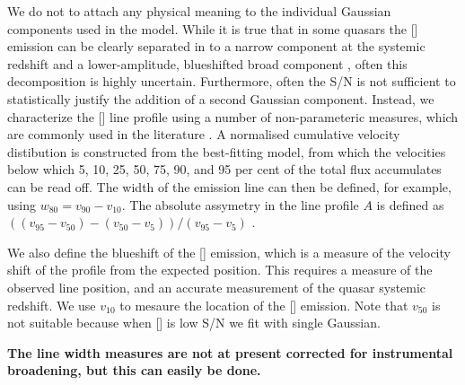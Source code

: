 We do not to attach any physical meaning to the individual Gaussian components used in the model. 
While it is true that in some quasars the [] emission can be clearly separated in to a narrow component at the systemic redshift and a lower-amplitude, blueshifted broad component \citep[e.g.][]{shen16a}, often this decomposition is highly uncertain.
Furthermore, often the S/N is not sufficient to statistically justify the addition of a second Gaussian component.  
Instead, we characterize the [] line profile using a number of non-parameteric measures, which are commonly used in the literature \citep[e.g.][]{zakamska14,zakamska16}. 
A normalised cumulative velocity distibution is constructed from the best-fitting model, from which the velocities below which 5, 10, 25, 50, 75, 90, and 95 per cent of the total flux accumulates can be read off. 
The width of the emission line can then be defined, for example, using $w_{80} = v_{90} - v_{10}$. 
The absolute assymetry in the line profile $A$ is defined as $((v_{95} - v_{50}) - (v_{50} - v_{5})) / (v_{95} - v_{5})$ \citep{zakamska14}. 

We also define the blueshift of the [] emission, which is a measure of the velocity shift of the profile from the expected position. 
This requires a measure of the observed line position, and an accurate measurement of the quasar systemic redshift. 
We use $v_{10}$ to mesaure the location of the [] emission. 
Note that $v_{50}$ is not suitable because when [] is low S/N we fit with single Gaussian. 

{\bf The line width measures are not at present corrected for instrumental broadening, but this can easily be done.}

